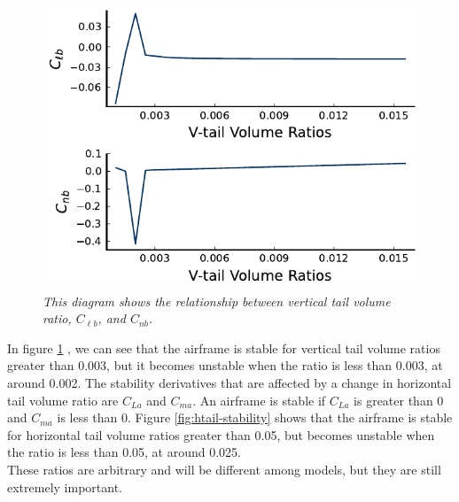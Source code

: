 \documentclass{journal}
\begin{document}
	\begin{figure}
		\centering
		\includegraphics{../graphics/vtail-stability.pdf}
		\caption{\emph{This diagram shows the relationship between vertical tail volume ratio, \(C_{\ell{b}}\), and \(C_{nb}\).}}
		\label{fig:vtail-stability}
	\end{figure}

	In figure \ref{fig:vtail-stability} , we can see that the airframe is stable for vertical tail volume ratios greater than 0.003, but it becomes unstable when the ratio is less than 0.003, at around 0.002. The stability derivatives that are affected by a change in horizontal tail volume ratio are \(C_{La}\) and \(C_{ma}\). An airframe is stable if \(C_{La}\) is greater than 0 and \(C_{ma}\) is less than 0. Figure \ref{fig:htail-stability} shows that the airframe is stable for horizontal tail volume ratios greater than 0.05, but becomes unstable when the ratio is less than 0.05, at around 0.025. \\
	
	These ratios are arbitrary and will be different among models, but they are still extremely important. \\
\end{document}
